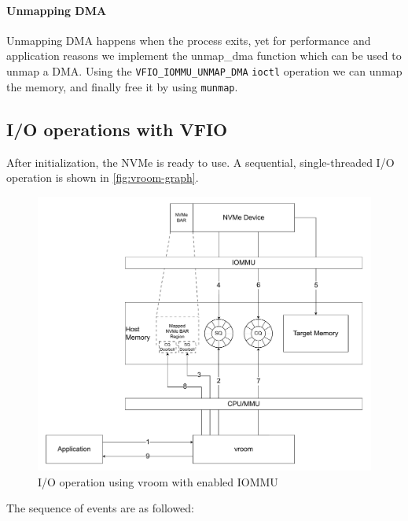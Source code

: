 \paragraph{Unmapping DMA}
Unmapping DMA happens when the process exits, yet for performance and application reasons we implement the unmap\_dma function which can be used to unmap a DMA. Using the \texttt{VFIO\_IOMMU\_UNMAP\_DMA} \texttt{ioctl} operation we can unmap the memory, and finally free it by using \texttt{munmap}.

\newpage

\subsection{I/O operations with VFIO}
After initialization, the NVMe is ready to use. A sequential, single-threaded I/O operation is shown in \autoref{fig:vroom-graph}.
\begin{figure}
    \centering
    \includegraphics[width=\textwidth]{figures/vroomdiagram.pdf}
    \caption{I/O operation using vroom with enabled IOMMU}
    \label{fig:vroom-graph}
\end{figure}
The sequence of events are as followed:

